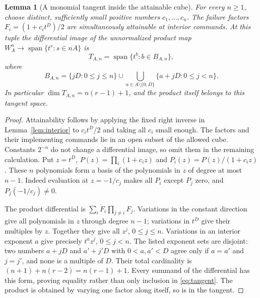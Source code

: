 \documentclass[11pt]{amsart}
\newtheorem{lemma}[theorem]{Lemma}
\theoremstyle{definition}\newtheorem{definition}[theorem]{Definition}
\theoremstyle{remark}\newtheorem{remark}[theorem]{Remark}
\DeclareMathOperator{\spanop}{span}\DeclareMathOperator{\rank}{rank}
\begin{document}
\begin{lemma}[A monomial tangent inside the attainable cube]\label{lem:binomial-tangent}
For every $n\ge1$, choose distinct, sufficiently small positive numbers
$c_1,\ldots,c_n$. The failure factors
$F_i=(1+c_it^D)/2$ are simultaneously attainable at interior commands.
At this tuple the differential image of the unnormalized product map
$W_A^n\to\spanop\{t^s:s\in nA\}$ is
\begin{equation}\label{eq:tangent}
 T_{A,n}=\spanop\{t^b:b\in B_{A,n}\},
\end{equation}
where
\begin{equation}\label{eq:tangent-support}
 B_{A,n}=\{jD:0\le j\le n\}
 \cup\!\!\bigcup_{a\in A\setminus\{0,D\}}
          \{a+jD:0\le j<n\}.
\end{equation}
In particular $\dim T_{A,n}=n(r-1)+1$, and the product itself belongs to
this tangent space.
\end{lemma}
\begin{proof}
Attainability follows by applying the fixed right inverse in
Lemma~\ref{lem:interior} to $c_it^D/2$ and taking all $c_i$ small enough.
The factors and their implementing commands lie in an open subset of
the allowed cube. Constants $2^{-n}$ do not change a differential image,
so omit them in the remaining calculation. Put $z=t^D$,
$P(z)=\prod_i(1+c_iz)$ and $P_i(z)=P(z)/(1+c_iz)$. These $n$
polynomials form a basis of the polynomials in $z$ of degree at most
$n-1$. Indeed evaluation at $z=-1/c_j$ makes all $P_i$ except $P_j$
zero, and $P_j(-1/c_j)\ne0$.

The product differential is $\sum_i\dot F_i\prod_{j\ne i}F_j$.
Variations in the constant direction give all polynomials in $z$ through
degree $n-1$; variations in $t^D$ give their multiples by $z$.
Together they give all $z^j$, $0\le j\le n$. Variations in an interior
exponent $a$ give precisely $t^a z^j$, $0\le j<n$. The listed exponent
sets are disjoint: two numbers $a+jD$ and $a'+j'D$ with
$0<a,a'<D$ agree only if $a=a'$ and $j=j'$, and none is a multiple of
$D$. Their total cardinality is $(n+1)+n(r-2)=n(r-1)+1$.
Every summand of the differential has this form, proving equality rather
than only inclusion in \eqref{eq:tangent}. The product is obtained by
varying one factor along itself, so is in the tangent.
\end{proof}
\end{document}
